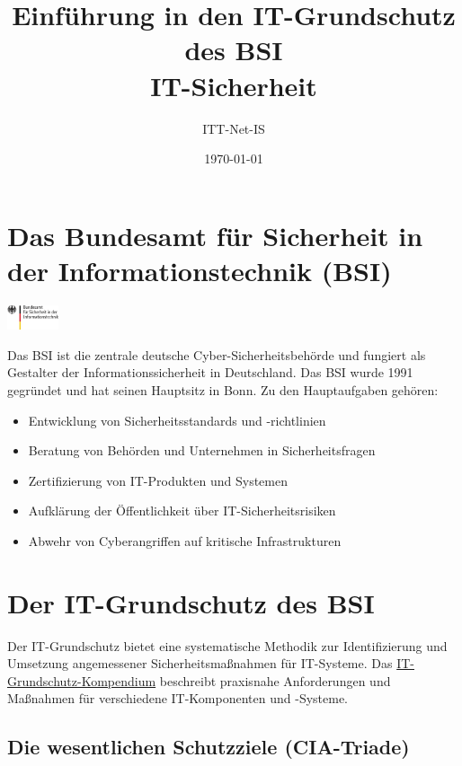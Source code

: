 \documentclass{orgstandard}
\author{ITT-Net-IS}
\date{\today}
\title{Einführung in den IT-Grundschutz des BSI\\\medskip
\large IT-Sicherheit}
\begin{document}
\maketitle
\section{Das Bundesamt für Sicherheit in der Informationstechnik (BSI)}
\label{sec:org9ed000d}

\begin{center}
\includegraphics[width=1.5cm]{img/BSI_logo.png}
\end{center}

Das BSI ist die zentrale deutsche Cyber-Sicherheitsbehörde und fungiert als Gestalter der Informationssicherheit in Deutschland. Das BSI wurde 1991 gegründet und hat seinen Hauptsitz in Bonn.
Zu den Hauptaufgaben gehören:
\begin{itemize}
\item Entwicklung von Sicherheitsstandards und -richtlinien
\item Beratung von Behörden und Unternehmen in Sicherheitsfragen
\item Zertifizierung von IT-Produkten und Systemen
\item Aufklärung der Öffentlichkeit über IT-Sicherheitsrisiken
\item Abwehr von Cyberangriffen auf kritische Infrastrukturen
\end{itemize}
\section{Der IT-Grundschutz des BSI}
\label{sec:orgddaacab}

Der IT-Grundschutz bietet eine systematische Methodik zur Identifizierung und Umsetzung angemessener Sicherheitsmaßnahmen für IT-Systeme. Das \href{https://www.bsi.bund.de/DE/Themen/Unternehmen-und-Organisationen/Standards-und-Zertifizierung/IT-Grundschutz/IT-Grundschutz-Kompendium/it-grundschutz-kompendium\_node.html}{IT-Grundschutz-Kompendium} beschreibt praxisnahe Anforderungen und Maßnahmen für verschiedene IT-Komponenten und -Systeme.
\subsection{Die wesentlichen Schutzziele (CIA-Triade)}
\label{sec:org706d1a6}
\end{document}
